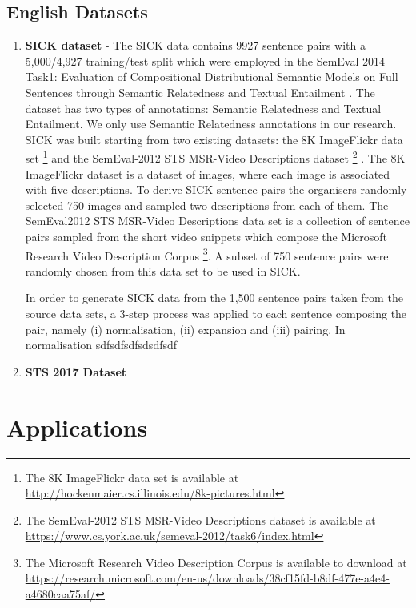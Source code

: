 \subsection{English Datasets}
\begin{enumerate}
  \item \textbf{SICK dataset} - The SICK data contains 9927 sentence pairs with a 5,000/4,927 training/test split which were employed in the SemEval 2014 Task1: Evaluation of Compositional Distributional Semantic Models on Full Sentences through Semantic Relatedness and Textual Entailment \cite{marelli-etal-2014-semeval}. The dataset has two types of annotations: Semantic Relatedness and Textual Entailment. We only use Semantic Relatedness annotations in our research. SICK was built starting from two existing datasets: the 8K ImageFlickr data set \footnote{The 8K ImageFlickr data set is available at \url{http://hockenmaier.cs.illinois.edu/8k-pictures.html}} \cite{rashtchian-etal-2010-collecting} and the SemEval-2012 STS MSR-Video Descriptions dataset \footnote{The SemEval-2012 STS MSR-Video Descriptions dataset is available at \url{https://www.cs.york.ac.uk/semeval-2012/task6/index.html}} \cite{agirre-etal-2012-semeval}. The 8K ImageFlickr dataset is a dataset of images, where each image is associated with five descriptions. To derive SICK sentence pairs the organisers randomly selected 750 images and sampled two descriptions from each of them. The SemEval2012 STS MSR-Video Descriptions data set is a collection of sentence pairs sampled from the short video snippets which compose the Microsoft Research Video Description Corpus \footnote{The Microsoft Research Video Description Corpus is available to download at \url{https://research.microsoft.com/en-us/downloads/38cf15fd-b8df-477e-a4e4-a4680caa75af/}}. A subset of 750 sentence pairs were randomly chosen from this data set to be used in SICK. 
  
  In order to generate SICK data from the 1,500 sentence pairs taken from the source data sets, a 3-step process was applied to each sentence composing the pair, namely (i) normalisation, (ii) expansion and (iii) pairing. In normalisation sdfsdfsdfsdsdfsdf 
  
  \item \textbf{STS 2017 Dataset}
  
\end{enumerate}

\section{Applications}


